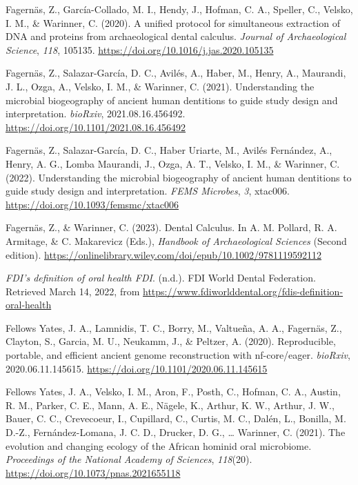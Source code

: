 \documentclass[
  letterpaper,
]{book}
\newlength{\cslhangindent}
\newlength{\cslentryspacingunit} %
\newenvironment{CSLReferences}[2] %
 {%
  \setlength{\parindent}{0pt}
  \ifodd #1
  \let\oldpar\par
  \def\par{\hangindent=\cslhangindent\oldpar}
  \fi
  \setlength{\parskip}{#2\cslentryspacingunit}
 }%
 {}
\begin{document}
\begin{CSLReferences}{1}{0}
\leavevmode{}%
Fagernäs, Z., García-Collado, M. I., Hendy, J., Hofman, C. A., Speller,
C., Velsko, I. M., \& Warinner, C. (2020). A unified protocol for
simultaneous extraction of {DNA} and proteins from archaeological dental
calculus. \emph{Journal of Archaeological Science}, \emph{118}, 105135.
\url{https://doi.org/10.1016/j.jas.2020.105135}

\leavevmode{}%
Fagernäs, Z., Salazar-García, D. C., Avilés, A., Haber, M., Henry, A.,
Maurandi, J. L., Ozga, A., Velsko, I. M., \& Warinner, C. (2021).
Understanding the microbial biogeography of ancient human dentitions to
guide study design and interpretation. \emph{bioRxiv},
2021.08.16.456492. \url{https://doi.org/10.1101/2021.08.16.456492}

\leavevmode{}%
Fagernäs, Z., Salazar-García, D. C., Haber Uriarte, M., Avilés
Fernández, A., Henry, A. G., Lomba Maurandi, J., Ozga, A. T., Velsko, I.
M., \& Warinner, C. (2022). Understanding the microbial biogeography of
ancient human dentitions to guide study design and interpretation.
\emph{FEMS Microbes}, \emph{3}, xtac006.
\url{https://doi.org/10.1093/femsmc/xtac006}

\leavevmode{}%
Fagernäs, Z., \& Warinner, C. (2023). Dental {Calculus}. In A. M.
Pollard, R. A. Armitage, \& C. Makarevicz (Eds.), \emph{Handbook of
{Archaeological Sciences}} (Second edition).
\url{https://onlinelibrary.wiley.com/doi/epub/10.1002/9781119592112}

\leavevmode{}%
\emph{{FDI}'s definition of oral health \textbar{} {FDI}}. (n.d.). {FDI
World Dental Federation}. Retrieved March 14, 2022, from
\url{https://www.fdiworlddental.org/fdis-definition-oral-health}

\leavevmode{}%
Fellows Yates, J. A., Lamnidis, T. C., Borry, M., Valtueña, A. A.,
Fagernäs, Z., Clayton, S., Garcia, M. U., Neukamm, J., \& Peltzer, A.
(2020). Reproducible, portable, and efficient ancient genome
reconstruction with nf-core/eager. \emph{bioRxiv}, 2020.06.11.145615.
\url{https://doi.org/10.1101/2020.06.11.145615}

\leavevmode{}%
Fellows Yates, J. A., Velsko, I. M., Aron, F., Posth, C., Hofman, C. A.,
Austin, R. M., Parker, C. E., Mann, A. E., Nägele, K., Arthur, K. W.,
Arthur, J. W., Bauer, C. C., Crevecoeur, I., Cupillard, C., Curtis, M.
C., Dalén, L., Bonilla, M. D.-Z., Fernández-Lomana, J. C. D., Drucker,
D. G., \ldots{} Warinner, C. (2021). The evolution and changing ecology
of the {African} hominid oral microbiome. \emph{Proceedings of the
National Academy of Sciences}, \emph{118}(20).
\url{https://doi.org/10.1073/pnas.2021655118}


\end{CSLReferences}
\end{document}
